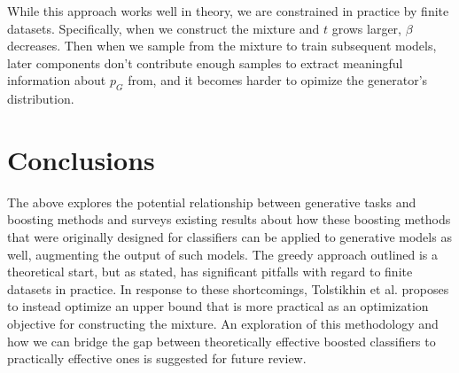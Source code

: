 \documentclass[submission]{eptcs}
\begin{document}
While this approach works well in theory, we are constrained in practice by finite datasets. Specifically, when we construct the mixture and $t$ grows larger, $\beta$ decreases. Then when we sample from the mixture to train subsequent models, later components don't contribute enough samples to extract meaningful information about $p_G$ from, and it becomes harder to opimize the generator's distribution.

\section{Conclusions}

The above explores the potential relationship between generative tasks and boosting methods and surveys existing results about how these boosting methods that were originally designed for classifiers can be applied to generative models as well, augmenting the output of such models. The greedy approach outlined is a theoretical start, but as stated, has significant pitfalls with regard to finite datasets in practice. In response to these shortcomings, Tolstikhin et al. proposes to instead optimize an upper bound that is more practical as an optimization objective for constructing the mixture. An exploration of this methodology and how we can bridge the gap between theoretically effective boosted classifiers to practically effective ones is suggested for future review.
\end{document}
